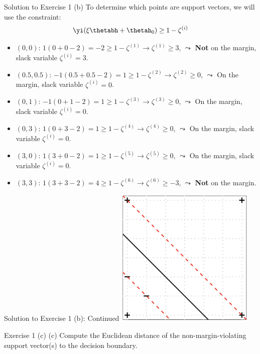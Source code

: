 \documentclass[aspectratio=169]{beamer}
\newcommand{\zetai}{\zeta^{(i)}}
\begin{document}
\begin{frame}{Solution to Exercise 1 (b)}
	To determine which points are support vectors, we will use the constraint:
	\begin{align*}
		\yi (\xi \thetabh + \thetah_0) \geq 1 - \zetai 
	\end{align*}
	\small
	\begin{itemize}
		\item<2-> $(0,0)$: $1 (0 + 0 - 2) = -2 \geq 1 - \zeta^{(1)} \rightarrow \zeta^{(1)} \geq 3$, $\leadsto$ \textbf{Not} on the margin,  slack variable $\zetai = 3$.
		\item<3-> $(0.5, 0.5)$: $-1 (0.5 + 0.5 - 2) = 1 \geq 1 - \zeta^{(2)} \rightarrow \zeta^{(2)} \geq 0$, $\leadsto$ On the margin, slack variable $\zetai = 0 $.
		\item<4-> $(0, 1)$: $ -1 (0 + 1 - 2) = 1 \geq 1 - \zeta^{(3)} \rightarrow \zeta^{(3)} \geq 0$, $\leadsto$ On the margin, slack variable $\zetai = 0$.
		\item<5-> $(0, 3)$: $ 1 (0 + 3 - 2) = 1 \geq 1 - \zeta^{(4)} \rightarrow \zeta^{(4)} \geq 0$, $\leadsto$ On the margin, slack variable $\zetai = 0$.
		\item<6-> $(3, 0)$: $ 1 (3 + 0 - 2) = 1 \geq 1 - \zeta^{(5)} \rightarrow \zeta^{(5)} \geq 0$, $\leadsto$ On the margin, slack variable $\zetai = 0$.
		\item<7-> $(3, 3)$: $ 1 (3 + 3 - 2) = 4 \geq 1 - \zeta^{(6)} \rightarrow \zeta^{(6)} \geq -3 $, $\leadsto$ \textbf{Not} on the margin.
	\end{itemize}
\end{frame}

\begin{frame}{Solution to Exercise 1 (b): Continued}
	\centering
	\includegraphics[width=0.5\textwidth]{figures/ex_1_b.png}
\end{frame}

\begin{frame}{Exercise 1 (c)}
	(c) Compute the Euclidean distance of the non-margin-violating support vector(s) to the decision boundary.
\end{frame}
\end{document}
